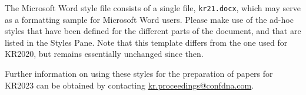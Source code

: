 \documentclass{article}
\begin{document}
The Microsoft Word style file consists of a single file, \texttt{kr21.docx},
which may serve as a formatting sample for Microsoft Word users.  Please make
use of the ad-hoc styles that have been defined for the different parts of the
document, and that are listed in the Styles Pane.  Note that this template
differs from the one used for KR2020, but remains essentially unchanged since then.

Further information on using these styles for the preparation of papers for
KR2023 can be obtained by contacting
\href{mailto:kr.proceedings@confdna.com}{kr.proceedings@confdna.com}.




\end{document}
